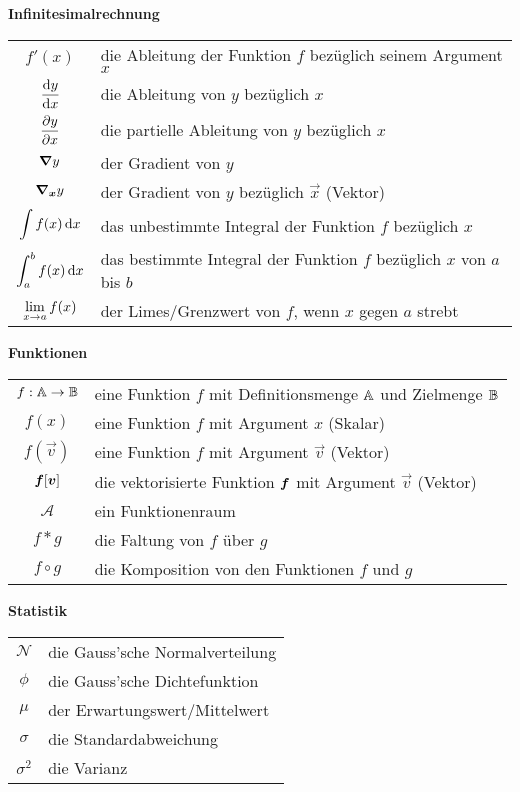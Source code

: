 \begin{center}\textbf{Infinitesimalrechnung}\end{center}
\begin{tabular}{cl}
  $f'(x)$ & die Ableitung der Funktion $f$ bezüglich seinem Argument $x$ \\
  $\displaystyle\frac{\text{d}y}{\text{d}x}$ & die Ableitung von $y$ bezüglich $x$ \\[2ex]
  $\displaystyle\frac{\partial y}{\partial x}$ & die partielle Ableitung von $y$ bezüglich $x$ \\[2ex]
  $\bm{\nabla} y$ & der Gradient von $y$\\
  $\bm{\nabla}_{\bm{x}}y$ & der Gradient von $y$ bezüglich $\vec{x}$ (Vektor) \\
  $\displaystyle\int f(x)\,\text{d}x$ & das unbestimmte Integral der Funktion $f$ bezüglich $x$ \\
  $\displaystyle\int_a^b f(x)\,\text{d}x$ & das bestimmte Integral der Funktion $f$ bezüglich $x$ von $a$ bis $b$ \\
  $\displaystyle\lim_{x \to a} f(x)$ & der Limes/Grenzwert von $f$, wenn $x$ gegen $a$ strebt \\

\end{tabular}

\begin{center}\textbf{Funktionen}\end{center}
\begin{tabular}{cl}
  $f: \mathbb{A} \to \mathbb{B}$ & eine Funktion $f$ mit Definitionsmenge $\mathbb{A}$ und Zielmenge $\mathbb{B}$ \\
  $f(x)$ & eine Funktion $f$ mit Argument $x$ (Skalar) \\
  $f(\vec{v})$ & eine Funktion $f$ mit Argument $\vec{v}$ (Vektor) \\
  $\bm{f}[\bm{v}]$ & die vektorisierte Funktion $\bm{f}$ mit Argument $\vec{v}$ (Vektor) \\
  $\mathcal{A}$ & ein Funktionenraum \\
  $f * g$ & die Faltung von $f$ über $g$ \\
  $f \circ g$ & die Komposition von den Funktionen $f$ und $g$ \\

\end{tabular}

\begin{center}\textbf{Statistik}\end{center}
\begin{tabular}{cl}
  $\mathcal{N}$ & die Gauss'sche Normalverteilung \\
  $\phi$ & die Gauss'sche Dichtefunktion \\
  $\mu$ & der Erwartungswert/Mittelwert \\
  $\sigma$ & die Standardabweichung \\
  $\sigma^2$ & die Varianz
\end{tabular}

